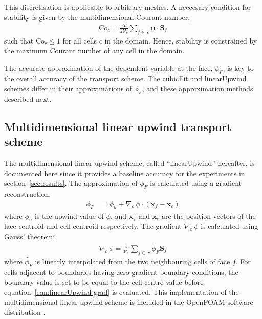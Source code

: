 This discretisation is applicable to arbitrary meshes.  A neccesary condition for stability is given by the multidimensional Courant number,
\begin{align}
	\mathrm{Co}_c = \frac{\Delta t}{2 \mathcal{V}_c} \sum_{f \in\: c} \mathbf{u} \cdot \mathbf{S}_f
\end{align}
such that $\mathrm{Co}_c \leq 1$ for all cells $c$ in the domain.  Hence, stability is constrained by the maximum Courant number of any cell in the domain.

The accurate approximation of the dependent variable at the face, $\phi_F$, is key to the overall accuracy of the transport scheme. The cubicFit and linearUpwind schemes differ in their approximations of $\phi_F$, and these approximation methods described next.




\subsection{Multidimensional linear upwind transport scheme}
The multidimensional linear upwind scheme, called ``linearUpwind'' hereafter, is documented here since it provides a baseline accuracy for the experiments in section~\ref{sec:results}.  The approximation of $\phi_F$ is calculated using a gradient reconstruction,
\begin{align}
	\phi_F &= \phi_u + \nabla_c\: \phi \cdot \left(\mathbf{x}_f - \mathbf{x}_c \right)
\end{align} 
where $\phi_u$ is the upwind value of $\phi$, and $\mathbf{x}_f$ and $\mathbf{x}_c$ are the position vectors of the face centroid and cell centroid respectively.
The gradient $\nabla_c \:\phi$ is calculated using Gauss' theorem:
\begin{align}
	\nabla_c\: \phi = \frac{1}{\mathcal{V}_c} \sum_{f\in\:c} \tilde{\phi_F} \mathbf{S}_f \label{eqn:linearUpwind-grad}
\end{align}
where $\tilde{\phi_F}$ is linearly interpolated from the two neighbouring cells of face $f$.  For cells adjacent to boundaries having zero gradient boundary conditions, the boundary value is set to be equal to the cell centre value before equation~\eqref{eqn:linearUpwind-grad} is evaluated.
This implementation of the multidimensional linear upwind scheme is included in the OpenFOAM software distribution \citep{openfoam}.

